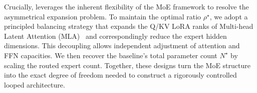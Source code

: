 Crucially, \ourmodel leverages the inherent flexibility of the MoE framework to resolve the asymmetrical expansion problem. To maintain the optimal ratio $\rho^\star$, we adopt a principled balancing strategy that expands the Q/KV LoRA ranks of Multi-head Latent Attention (MLA)~\cite{liu2024deepseek} and correspondingly reduce the expert hidden dimensions. This decoupling allows independent adjustment of attention and FFN capacities. We then recover the baseline's total parameter count $N^\star$ by scaling the routed expert count. Together, these designs turn the MoE structure into the exact degree of freedom needed to construct a rigorously controlled looped architecture.


